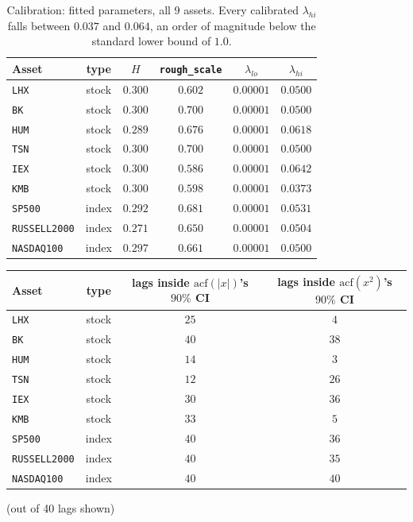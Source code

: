 \documentclass[11pt]{article}
\begin{document}
\begin{table}[h]
\centering
\caption{Calibration: fitted parameters, all 9 assets. Every calibrated
$\lambda_{hi}$ falls between $0.037$ and $0.064$, an order of magnitude below
the standard lower bound of $1.0$.}
\label{tab:taylorwidened}
\begin{tabular}{lccccc}
\toprule
Asset & type & $H$ & \texttt{rough\_scale} & $\lambda_{lo}$ & $\lambda_{hi}$ \\
\midrule
\texttt{LHX}         & stock & $0.300$ & $0.602$ & $0.00001$ & $0.0500$ \\
\texttt{BK}          & stock & $0.300$ & $0.700$ & $0.00001$ & $0.0500$ \\
\texttt{HUM}         & stock & $0.289$ & $0.676$ & $0.00001$ & $0.0618$ \\
\texttt{TSN}         & stock & $0.300$ & $0.700$ & $0.00001$ & $0.0500$ \\
\texttt{IEX}         & stock & $0.300$ & $0.586$ & $0.00001$ & $0.0642$ \\
\texttt{KMB}         & stock & $0.300$ & $0.598$ & $0.00001$ & $0.0373$ \\
\texttt{SP500}       & index & $0.292$ & $0.681$ & $0.00001$ & $0.0531$ \\
\texttt{RUSSELL2000} & index & $0.271$ & $0.650$ & $0.00001$ & $0.0504$ \\
\texttt{NASDAQ100}   & index & $0.297$ & $0.661$ & $0.00001$ & $0.0500$ \\
\bottomrule
\end{tabular}
\end{table}

\begin{center}
\begin{tabular}{lccc}
\toprule
Asset & type & lags inside $\text{acf}(|x|)$'s $90\%$ CI & lags inside $\text{acf}(x^2)$'s $90\%$ CI \\
\midrule
\texttt{LHX}         & stock & $25$ & $4$  \\
\texttt{BK}          & stock & $40$ & $38$ \\
\texttt{HUM}         & stock & $14$ & $3$  \\
\texttt{TSN}         & stock & $12$ & $26$ \\
\texttt{IEX}         & stock & $30$ & $36$ \\
\texttt{KMB}         & stock & $33$ & $5$  \\
\texttt{SP500}       & index & $40$ & $36$ \\
\texttt{RUSSELL2000} & index & $40$ & $35$ \\
\texttt{NASDAQ100}   & index & $40$ & $40$ \\
\bottomrule
\end{tabular}
\quad (out of 40 lags shown)
\end{center}
\end{document}
